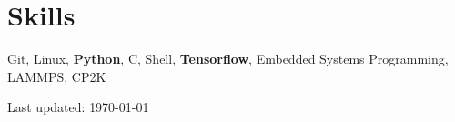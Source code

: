 \documentclass[a4paper,10pt]{article} %
\begin{document}
\section{Skills}
\begin{small}
Git, Linux, \textbf{Python}, C, Shell, \textbf{Tensorflow}, Embedded Systems Programming, LAMMPS, CP2K
\end{small}

\begin{flushright} 
Last updated: {\today}
\end{flushright}
\end{document}
